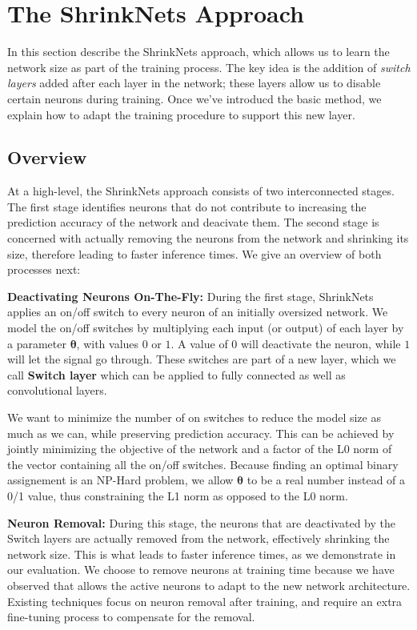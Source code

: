 
\section{The ShrinkNets Approach}

In this section describe the
ShrinkNets approach, which allows us to learn the network size as part of the
training process. The key idea is the addition of 
\emph{switch layers} added after each layer in the network;  these 
layers allow us to disable certain neurons during training.
 Once we've introducd the basic method, we
 explain how to adapt the training procedure to
support this new layer. %

\subsection{Overview}

At a high-level, the ShrinkNets approach consists of two interconnected stages.
The first stage identifies neurons that do not contribute
to increasing the prediction accuracy of the network and deacivate them. The
second stage is concerned with actually removing the neurons from the network
and shrinking its size, therefore leading to faster inference times. We give an
overview of both processes next:

\noindent\textbf{Deactivating Neurons On-The-Fly: }During the first stage,
ShrinkNets applies an on/off switch to every neuron of an initially oversized
network. We model the on/off switches by multiplying each input (or output) of
each layer by a parameter $\bm{\theta}$, with values $0$ or $1$. A value of $0$
will deactivate the neuron, while $1$ will let the signal go through. These
switches are part of a new layer, which we call \textbf{Switch layer} which can
be applied to fully connected as well as convolutional layers.

We want to minimize the number of on switches to reduce the model size as much
as we can, while preserving prediction accuracy. This can be achieved by jointly
minimizing the objective of the network and a factor of the L0 norm of the
vector containing all the on/off switches. Because finding an optimal binary
assignement is an NP-Hard problem, we allow $\bm{\theta}$ to be a real number
instead of a 0/1 value, thus constraining the L1 norm as opposed to the L0 norm.

\noindent\textbf{Neuron Removal: } During this stage, the neurons that are
deactivated by the Switch layers are actually removed from the network,
effectively shrinking the network size. This is what leads to faster inference
times, as we demonstrate in our evaluation. We choose to remove neurons at
training time because we have observed that allows the active neurons to adapt
to the new network architecture. Existing techniques focus on neuron removal
after training, and require an extra fine-tuning process to compensate for the
removal.

